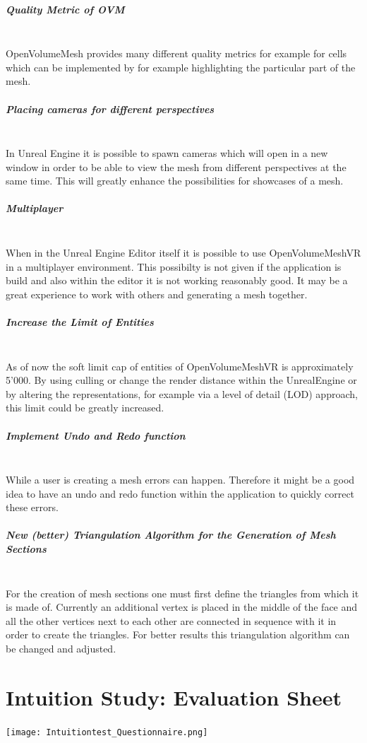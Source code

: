 \documentclass{report}
\begin{document}
	\paragraph{Quality Metric of OVM} \hfill \\
	OpenVolumeMesh provides many different quality metrics for example for cells which can be implemented by for example highlighting the particular part of the mesh.
	\paragraph{Placing cameras for different perspectives} \hfill \\
	In Unreal Engine it is possible to spawn cameras which will open in a new window in order to be able to view the mesh from different perspectives at the same time. This will greatly enhance the possibilities for showcases of a mesh.
	\paragraph{Multiplayer} \hfill \\
	When in the Unreal Engine Editor itself it is possible to use OpenVolumeMeshVR in a multiplayer environment. This possibilty is not given if the application is build and also within the editor it is not working reasonably good. It may be a great experience to work with others and generating a mesh together.
	\paragraph{Increase the Limit of Entities} \hfill \\
	As of now the soft limit cap of entities of OpenVolumeMeshVR is approximately 5'000. By using culling or change the render distance within the UnrealEngine or by altering the representations, for example via a level of detail (LOD) approach, this limit could be greatly increased.
	\paragraph{Implement Undo and Redo function} \hfill \\
	While a user is creating a mesh errors can happen. Therefore it might be a good idea to have an undo and redo function within the application to quickly correct these errors.	
	\paragraph{New (better) Triangulation Algorithm for the Generation of Mesh Sections} \hfill \\
	For the creation of mesh sections one must first define the triangles from which it is made of. Currently an additional vertex is placed in the middle of the face and all the other vertices next to each other are connected in sequence with it in order to create the triangles. For better results this triangulation algorithm can be changed and adjusted.

\newpage
{}


\appendix
	
\chapter{Intuition Study: Evaluation Sheet} \label{appendix:questionnaire}
	\texttt{[image: Intuitiontest\_Questionnaire.png]}
	
\end{document}
